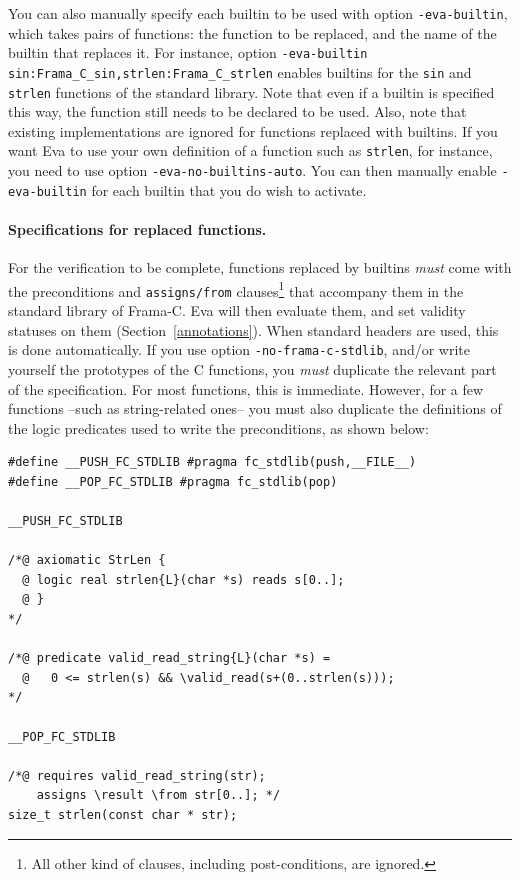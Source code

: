 \documentclass[web]{frama-c-book}
\newcommand{\Eva}{\textsf{Eva}}
\begin{document}
You can also manually specify each builtin to be used with option
\lstinline|-eva-builtin|, which takes pairs of functions:
the function to be replaced, and the name of the builtin that replaces it.
For instance, option
\lstinline|-eva-builtin sin:Frama_C_sin,strlen:Frama_C_strlen| enables
builtins for the \lstinline|sin| and \lstinline|strlen| functions of the
standard library. Note that even if a builtin is specified this way,
the function still needs to be declared to be used.
%
Also, note that existing implementations are ignored
for functions replaced with builtins. If you want \Eva{} to use your own definition
of a function such as \lstinline|strlen|, for instance, you need to use option
\lstinline|-eva-no-builtins-auto|. You can then manually enable
\lstinline|-eva-builtin| for each builtin that you do wish to activate.

\paragraph{Specifications for replaced functions.}

For the verification to be complete, functions replaced by builtins
\emph{must} come with the preconditions and \lstinline+assigns/from+
clauses\footnote{All other kind of clauses, including post-conditions,
  are ignored.}  that accompany them in the standard library of
Frama-C. \Eva{} will then evaluate them, and set validity statuses on
them (Section~\ref{annotations}).
%
When standard headers are used, this is done automatically. If you use
option \lstinline|-no-frama-c-stdlib|, and/or write yourself the
prototypes of the C functions, you \emph{must} duplicate the relevant
part of the specification. For most functions, this is
immediate. However, for a few functions --such as string-related
ones-- you must also duplicate the definitions of the logic predicates
used to write the preconditions, as shown below:
%
\begin{lstlisting}
#define __PUSH_FC_STDLIB #pragma fc_stdlib(push,__FILE__)
#define __POP_FC_STDLIB #pragma fc_stdlib(pop)

__PUSH_FC_STDLIB

/*@ axiomatic StrLen {
  @ logic real strlen{L}(char *s) reads s[0..];
  @ }
*/

/*@ predicate valid_read_string{L}(char *s) =
  @   0 <= strlen(s) && \valid_read(s+(0..strlen(s)));
*/

__POP_FC_STDLIB

/*@ requires valid_read_string(str);
    assigns \result \from str[0..]; */
size_t strlen(const char * str);
\end{lstlisting}
\end{document}
